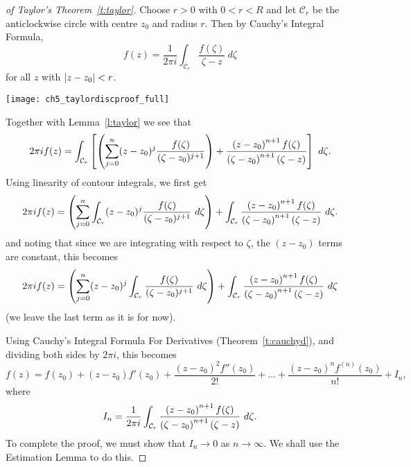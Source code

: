 \begin{proof}[of Taylor's Theorem~\ref{t:taylor}]
Choose $r>0$ with $0 < r < R$ and let $\mathcal{C}_r$ be the anticlockwise circle with centre $z_0$ and radius $r$.  Then by Cauchy's Integral Formula,
\[
f(z) = \frac{1}{2\pi i} \int_{\mathcal{C}_r} \frac{f(\zeta)}{\zeta-z}\ d\zeta
\]
for all $z$ with $\left| z-z_0 \right|<r$.
\begin{center}
\texttt{[image: ch5\_taylordiscproof\_full]}
\end{center}

Together with Lemma~\ref{l:taylor} we see that
\[
2\pi i f(z) = \int_{\mathcal{C}_r} \left[ \left( \sum_{j=0}^n (z-z_0)^j \frac{f(\zeta)}{(\zeta-z_0)^{j+1}} \right) + \frac{\left( z-z_0 \right)^{n+1}f(\zeta)}{\left( \zeta-z_0 \right)^{n+1} \left( \zeta-z \right)}  \right]\ d \zeta. 
\]
Using linearity of contour integrals, we first get
\[
2\pi i f(z) = \left( \sum_{j=0}^n \int_{\mathcal{C}_r} (z-z_0)^j \frac{f(\zeta)}{(\zeta-z_0)^{j+1}}\ d\zeta \right) + \int_{\mathcal{C}_r} \frac{\left( z-z_0 \right)^{n+1}f(\zeta)}{\left( \zeta-z_0 \right)^{n+1} \left( \zeta-z \right)}\ d\zeta.
\]
and noting that since we are integrating with respect to $\zeta$, the $(z-z_0)$ terms are constant, this becomes
\[
2\pi i f( z) = \left( \sum_{j=0}^n (z-z_0)^j  \int_{\mathcal{C}_r} \frac{f(\zeta)}{(\zeta-z_0)^{j+1}}\ d\zeta \right) + \int_{\mathcal{C}_r} \frac{\left( z-z_0 \right)^{n+1}f(\zeta)}{\left( \zeta-z_0 \right)^{n+1} \left( \zeta-z \right)}\ d\zeta
\]
(we leave the last term as it is for now).

Using Cauchy's Integral Formula For Derivatives (Theorem~\ref{t:cauchyd}), and dividing both sides by $2\pi i$, this becomes
\[
f(z) = f(z_0)+(z-z_0)f'(z_0)+\frac{(z-z_0)^2f''(z_0)}{2!}+\ldots+ \frac{(z-z_0)^n f^{(n)}(z_0)}{n!} + I_n,
\]
where 
\[
I_n = \frac{1}{2\pi i}\int_{\mathcal{C}_r}  \frac{\left( z-z_0 \right)^{n+1}f(\zeta)}{\left( \zeta-z_0 \right)^{n+1} \left( \zeta-z \right)}\ d\zeta.
\]
To complete the proof, we must show that $I_n \to 0$ as $n \to \infty$.  We shall use the Estimation Lemma to do this.


\end{proof}
